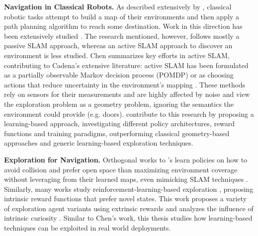 \textbf{Navigation in Classical Robots.} %
As described extensively by \textcite{chen2019learning}, classical robotic tasks attempt to build a map of their environments and then apply a path planning algorithm to reach some destination. Work in this direction has been extensively studied \cite{zisserman2004multiple, thrun2002probabilistic, lavalle2006planning}. The research mentioned, however, follows mostly a passive SLAM approach, whereas an active SLAM approach to discover an environment is less studied. Chen summarizes key efforts in active SLAM, contributing to Cadena's \cite{cadena2016past} extensive literature: active SLAM has been formulated as a partially observable Markov decision process (POMDP) \cite{martinez2009bayesian} or as choosing actions that reduce uncertainty in the environment's mapping \cite{carrillo2012comparison}. These methods rely on sensors for their measurements and are highly affected by noise and view the exploration problem as a geometry problem, ignoring the semantics the environment could provide (e.g. doors). \textcite{chen2019learning} contribute to this research by proposing a learning-based approach, investigating different policy architectures, reward functions and training paradigms, outperforming classical geometry-based approaches and generic learning-based exploration techniques.

\textbf{Exploration for Navigation.} %
Orthogonal works \cite{gandhilearning, sadeghi2rl} to \textcite{chen2019learning}'s learn policies on how to avoid collision and prefer open space than maximizing environment coverage without leveraging from their learned maps, even mimicking SLAM techniques \cite{zhang2017neural}. Similarly, many works study reinforcement-learning-based exploration \cite{schmidhuber1991possibility, stadie2015incentivizing, pathak2017curiosity, fu2017ex2, lopes2012exploration, singh2005intrinsically}, proposing intrinsic reward functions that prefer novel states. 
This work proposes a variety of exploration agent variants using extrinsic rewards and analyzes the influence of intrinsic curiosity \cite{pathak2017curiosity}. Similar to Chen's work, this thesis studies how learning-based techniques can be exploited in real world deployments. 

